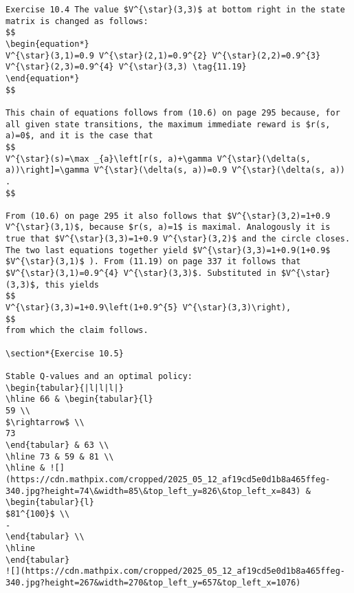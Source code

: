 \documentclass[10pt]{article}
\begin{document}
\begin{verbatim}
Exercise 10.4 The value $V^{\star}(3,3)$ at bottom right in the state matrix is changed as follows:
$$
\begin{equation*}
V^{\star}(3,1)=0.9 V^{\star}(2,1)=0.9^{2} V^{\star}(2,2)=0.9^{3} V^{\star}(2,3)=0.9^{4} V^{\star}(3,3) \tag{11.19}
\end{equation*}
$$

This chain of equations follows from (10.6) on page 295 because, for all given state transitions, the maximum immediate reward is $r(s, a)=0$, and it is the case that
$$
V^{\star}(s)=\max _{a}\left[r(s, a)+\gamma V^{\star}(\delta(s, a))\right]=\gamma V^{\star}(\delta(s, a))=0.9 V^{\star}(\delta(s, a)) .
$$

From (10.6) on page 295 it also follows that $V^{\star}(3,2)=1+0.9 V^{\star}(3,1)$, because $r(s, a)=1$ is maximal. Analogously it is true that $V^{\star}(3,3)=1+0.9 V^{\star}(3,2)$ and the circle closes. The two last equations together yield $V^{\star}(3,3)=1+0.9(1+0.9$ $V^{\star}(3,1)$ ). From (11.19) on page 337 it follows that $V^{\star}(3,1)=0.9^{4} V^{\star}(3,3)$. Substituted in $V^{\star}(3,3)$, this yields
$$
V^{\star}(3,3)=1+0.9\left(1+0.9^{5} V^{\star}(3,3)\right),
$$
from which the claim follows.

\section*{Exercise 10.5}

Stable Q-values and an optimal policy:
\begin{tabular}{|l|l|l|}
\hline 66 & \begin{tabular}{l}
59 \\
$\rightarrow$ \\
73
\end{tabular} & 63 \\
\hline 73 & 59 & 81 \\
\hline & ![](https://cdn.mathpix.com/cropped/2025_05_12_af19cd5e0d1b8a465ffeg-340.jpg?height=74\&width=85\&top_left_y=826\&top_left_x=843) & \begin{tabular}{l}
$81^{100}$ \\
-
\end{tabular} \\
\hline
\end{tabular}
![](https://cdn.mathpix.com/cropped/2025_05_12_af19cd5e0d1b8a465ffeg-340.jpg?height=267&width=270&top_left_y=657&top_left_x=1076)


\end{verbatim}
\end{document}
